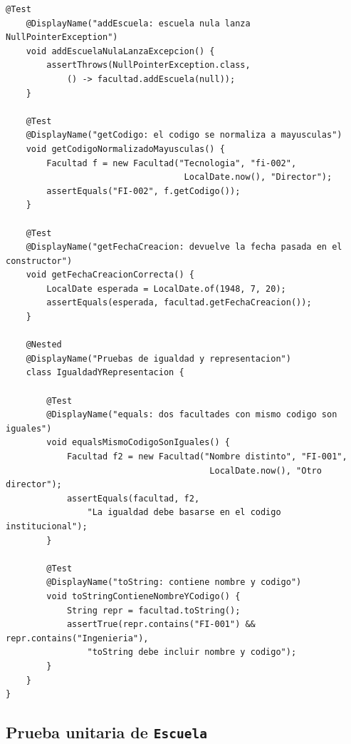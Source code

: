 \begin{lstlisting}[style=javaStyle,
  caption={Clase de prueba \texttt{FacultadTest} con JUnit~5.},
  label={lst:junit-facultad}]
    @Test
    @DisplayName("addEscuela: escuela nula lanza NullPointerException")
    void addEscuelaNulaLanzaExcepcion() {
        assertThrows(NullPointerException.class,
            () -> facultad.addEscuela(null));
    }

    @Test
    @DisplayName("getCodigo: el codigo se normaliza a mayusculas")
    void getCodigoNormalizadoMayusculas() {
        Facultad f = new Facultad("Tecnologia", "fi-002",
                                   LocalDate.now(), "Director");
        assertEquals("FI-002", f.getCodigo());
    }

    @Test
    @DisplayName("getFechaCreacion: devuelve la fecha pasada en el constructor")
    void getFechaCreacionCorrecta() {
        LocalDate esperada = LocalDate.of(1948, 7, 20);
        assertEquals(esperada, facultad.getFechaCreacion());
    }

    @Nested
    @DisplayName("Pruebas de igualdad y representacion")
    class IgualdadYRepresentacion {

        @Test
        @DisplayName("equals: dos facultades con mismo codigo son iguales")
        void equalsMismoCodigoSonIguales() {
            Facultad f2 = new Facultad("Nombre distinto", "FI-001",
                                        LocalDate.now(), "Otro director");
            assertEquals(facultad, f2,
                "La igualdad debe basarse en el codigo institucional");
        }

        @Test
        @DisplayName("toString: contiene nombre y codigo")
        void toStringContieneNombreYCodigo() {
            String repr = facultad.toString();
            assertTrue(repr.contains("FI-001") && repr.contains("Ingenieria"),
                "toString debe incluir nombre y codigo");
        }
    }
}
\end{lstlisting}

\subsection{Prueba unitaria de \texttt{Escuela}}
\label{subsec:prueba-escuela}

